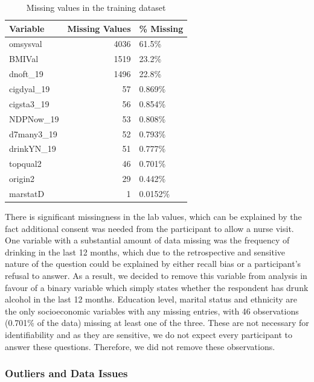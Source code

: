 \documentclass[
  11pt,
  twocolumn]{article}
\begin{document}
\begin{table}

\caption{\label{tab:outputnatable}Missing values in the training dataset\label{tab:output-na-table}}
\centering
\fontsize{9}{11}\selectfont
\begin{tabular}[t]{l|r|l}
\hline
\textbf{Variable} & \textbf{Missing Values} & \textbf{\% Missing}\\
\hline
omsysval & 4036 & 61.5\%\\
\hline
BMIVal & 1519 & 23.2\%\\
\hline
dnoft\_19 & 1496 & 22.8\%\\
\hline
cigdyal\_19 & 57 & 0.869\%\\
\hline
cigsta3\_19 & 56 & 0.854\%\\
\hline
NDPNow\_19 & 53 & 0.808\%\\
\hline
d7many3\_19 & 52 & 0.793\%\\
\hline
drinkYN\_19 & 51 & 0.777\%\\
\hline
topqual2 & 46 & 0.701\%\\
\hline
origin2 & 29 & 0.442\%\\
\hline
marstatD & 1 & 0.0152\%\\
\hline
\end{tabular}
\end{table}

There is significant missingness in the lab values, which can be
explained by the fact additional consent was needed from the participant
to allow a nurse visit. One variable with a substantial amount of data
missing was the frequency of drinking in the last 12 months, which due
to the retrospective and sensitive nature of the question could be
explained by either recall bias or a participant's refusal to answer. As
a result, we decided to remove this variable from analysis in favour of
a binary variable which simply states whether the respondent has drunk
alcohol in the last 12 months. Education level, marital status and
ethnicity are the only socioeconomic variables with any missing entries,
with 46 observations (0.701\% of the data) missing at least one of the
three. These are not necessary for identifiability and as they are
sensitive, we do not expect every participant to answer these questions.
Therefore, we did not remove these observations.

\hypertarget{outliers-and-data-issues}{%
\subsubsection{Outliers and Data
Issues}\label{outliers-and-data-issues}}
\end{document}
